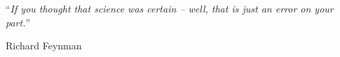 \documentclass[
11pt, %
oneside, %
english, %
doublespacing,
headsepline, %
]{MastersDoctoralThesis} %
\begin{document}


\leavevmode\thispagestyle{empty}\newpage

\vspace*{0.2\textheight}

%

\noindent\enquote{\itshape If you thought that science was certain -- well, that is just an error on your part.}\bigbreak

\hfill Richard Feynman


\end{document}
